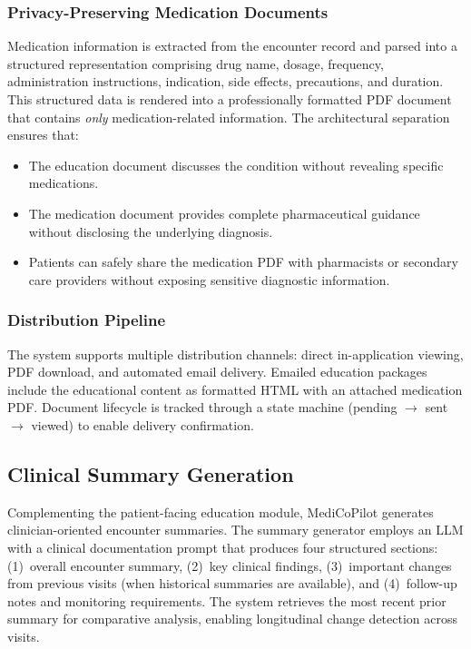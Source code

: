 \documentclass[conference]{IEEEtran}
\begin{document}
\subsubsection{Privacy-Preserving Medication Documents}
Medication information is extracted from the encounter record and parsed into a structured representation comprising drug name, dosage, frequency, administration instructions, indication, side effects, precautions, and duration. This structured data is rendered into a professionally formatted PDF document that contains \textit{only} medication-related information. The architectural separation ensures that:

\begin{itemize}
    \item The education document discusses the condition without revealing specific medications.
    \item The medication document provides complete pharmaceutical guidance without disclosing the underlying diagnosis.
    \item Patients can safely share the medication PDF with pharmacists or secondary care providers without exposing sensitive diagnostic information.
\end{itemize}

\subsubsection{Distribution Pipeline}
The system supports multiple distribution channels: direct in-application viewing, PDF download, and automated email delivery. Emailed education packages include the educational content as formatted HTML with an attached medication PDF. Document lifecycle is tracked through a state machine (pending $\rightarrow$ sent $\rightarrow$ viewed) to enable delivery confirmation.

\subsection{Clinical Summary Generation}

Complementing the patient-facing education module, MediCoPilot generates clinician-oriented encounter summaries. The summary generator employs an LLM with a clinical documentation prompt that produces four structured sections: (1)~overall encounter summary, (2)~key clinical findings, (3)~important changes from previous visits (when historical summaries are available), and (4)~follow-up notes and monitoring requirements. The system retrieves the most recent prior summary for comparative analysis, enabling longitudinal change detection across visits.
\end{document}

